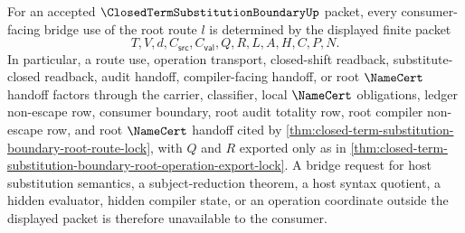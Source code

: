 \begin{lemma}
\label{lem:closed-term-substitution-boundary-root-route-bridge-determinacy}
For an accepted $\ClosedTermSubstitutionBoundaryUp$ packet, every consumer-facing bridge use of the root route $l$ is determined by the displayed finite packet
$$
T,V,d,C_{\mathsf{src}},C_{\mathsf{val}},Q,R,L,A,H,C,P,N.
$$
In particular, a route use, operation transport, closed-shift readback, substitute-closed readback, audit handoff, compiler-facing handoff, or root $\NameCert$ handoff factors through the carrier, classifier, local $\NameCert$ obligations, ledger non-escape row, consumer boundary, root audit totality row, root compiler non-escape row, and root $\NameCert$ handoff cited by \autoref{thm:closed-term-substitution-boundary-root-route-lock}, with $Q$ and $R$ exported only as in \autoref{thm:closed-term-substitution-boundary-root-operation-export-lock}. A bridge request for host substitution semantics, a subject-reduction theorem, a host syntax quotient, a hidden evaluator, hidden compiler state, or an operation coordinate outside the displayed packet is therefore unavailable to the consumer.
\end{lemma}
